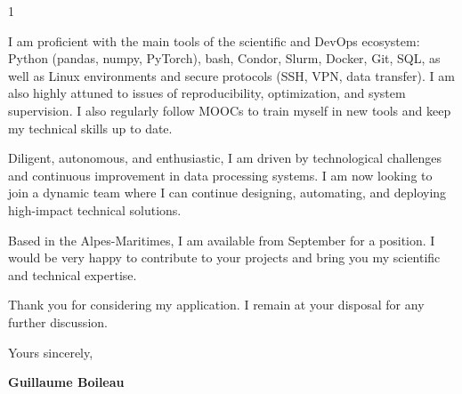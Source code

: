 \documentclass[10pt,a4paper]{../_shared/altacv}
\begin{document}
\begin{paracol}{1}
{I am proficient with the main tools of the scientific and DevOps ecosystem: Python (pandas, numpy, PyTorch), bash, Condor, Slurm, Docker, Git, SQL, as well as Linux environments and secure protocols (SSH, VPN, data transfer). I am also highly attuned to issues of reproducibility, optimization, and system supervision. I also regularly follow MOOCs to train myself in new tools and keep my technical skills up to date.

Diligent, autonomous, and enthusiastic, I am driven by technological challenges and continuous improvement in data processing systems. I am now looking to join a dynamic team where I can continue designing, automating, and deploying high-impact technical solutions.

Based in the Alpes-Maritimes, I am available from September for a position. I would be very happy to contribute to your projects and bring you my scientific and technical expertise.

Thank you for considering my application. I remain at your disposal for any further discussion.

Yours sincerely,

\textbf{Guillaume Boileau}


}


\end{paracol}
\end{document}
